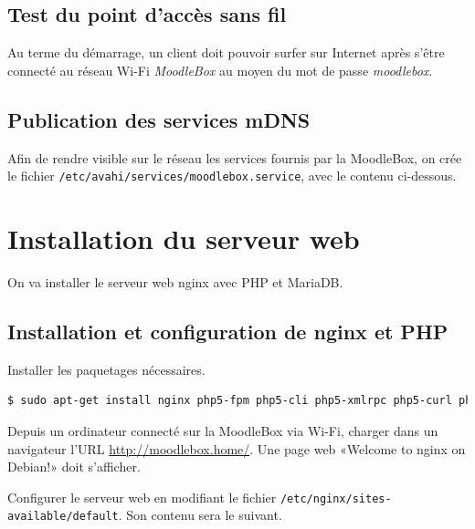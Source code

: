 \documentclass[11pt]{article}
\begin{document}
\subsection{Test du point d'accès sans fil}

\begin{verification}
Au terme du démarrage, un client doit pouvoir surfer sur Internet après s'être connecté au réseau Wi-Fi \emph{MoodleBox} au moyen du mot de passe \emph{moodlebox}.
\end{verification}

\subsection{Publication des services mDNS}

Afin de rendre visible sur le réseau les services fournis par la MoodleBox, on crée le fichier \lstinline{/etc/avahi/services/moodlebox.service}, avec le contenu ci-dessous.


\section{Installation du serveur web}

On va installer le serveur web nginx avec PHP et MariaDB.

\subsection{Installation et configuration de nginx et PHP}

Installer les paquetages nécessaires.

\begin{lstlisting}[language=bash]
$ sudo apt-get install nginx php5-fpm php5-cli php5-xmlrpc php5-curl php5-gd php5-intl
\end{lstlisting}

\begin{verification}
Depuis un ordinateur connecté sur la MoodleBox via Wi-Fi, charger dans un navigateur l'URL \url{http://moodlebox.home/}. Une page web «Welcome to nginx on Debian!» doit s'afficher.
\end{verification}

Configurer le serveur web en modifiant le fichier \lstinline{/etc/nginx/sites-available/default}.
Son contenu sera le suivant.
\end{document}

